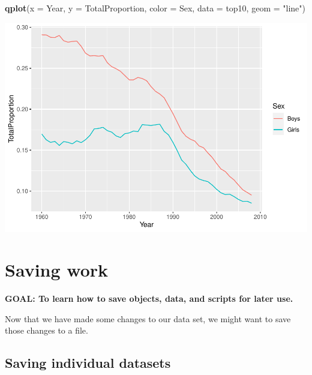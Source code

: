 \documentclass[
]{book}
\newenvironment{Shaded}{\begin{snugshade}}{\end{snugshade}}
\newcommand{\DataTypeTok}[1]{\textcolor[rgb]{0.13,0.29,0.53}{#1}}
\newcommand{\KeywordTok}[1]{\textcolor[rgb]{0.13,0.29,0.53}{\textbf{#1}}}
\newcommand{\NormalTok}[1]{#1}
\newcommand{\StringTok}[1]{\textcolor[rgb]{0.31,0.60,0.02}{#1}}
\begin{document}
\begin{alert}
\begin{enumerate}
\begin{Shaded}
\begin{Highlighting}[]
\KeywordTok{qplot}\NormalTok{(}\DataTypeTok{x =}\NormalTok{ Year, }
      \DataTypeTok{y =}\NormalTok{ TotalProportion, }
      \DataTypeTok{color =}\NormalTok{ Sex,}
      \DataTypeTok{data =}\NormalTok{ top10,}
      \DataTypeTok{geom =} \StringTok{"line"}\NormalTok{)}
\end{Highlighting}
\end{Shaded}

  \includegraphics{R/Rintro/figures/unnamed-chunk-72-1.pdf}
\end{enumerate}

\end{alert}

\hypertarget{saving-work}{%
\section{Saving work}\label{saving-work}}

\begin{alert}

\textbf{GOAL: To learn how to save objects, data, and scripts for later use.}

\end{alert}

Now that we have made some changes to our data set, we might want to save those changes to a file.

\hypertarget{saving-individual-datasets}{%
\subsection{Saving individual datasets}\label{saving-individual-datasets}}
\end{document}
